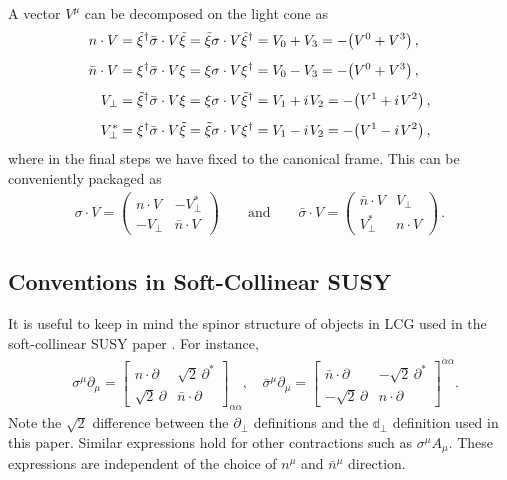 \documentclass[12pt,document,nofootinbib,superscriptaddress,onecolumn,preprintnumbers,balancelastpage]{article}
\newcommand{\s}{\hspace{0.8pt}}
\newcommand{\PP}{\mathbb{d}}
\newcommand{\nbp}{\bar{n}\cdot \partial}
\newcommand{\np}{n\cdot \partial}
\begin{document}
A vector $V^\mu$ can be decomposed on the light cone as
%
\begin{align}
n\cdot V &= \tilde{\xi}^\dag \bar{\sigma}\cdot V \tilde{\xi} = \tilde{\xi} \sigma\cdot V \tilde{\xi}^\dag= V_0 + V_3 = -\big(V^0 + V^3\big)\,, \notag \\[5pt]
\bar{n} \cdot V &= \xi^\dag \bar{\sigma}\cdot V \xi = \xi \sigma\cdot V \xi^\dag= V_0 - V_3 = -\big(V^0 + V^3\big)\,,\notag\\[5pt]
V_\perp &= \tilde{\xi}^\dag \bar{\sigma}\cdot V \xi = \xi \sigma\cdot V \tilde{\xi}^\dag =V_1 + i\s V_2 = -\big(V^1 + i\s V^2\big)\,, \notag\\[5pt] 
V_\perp^{*} &= \xi^\dag \bar{\sigma}\cdot V \tilde{\xi} = \tilde{\xi} \sigma\cdot V \xi^\dag =V_1 - i\s V_2 = -\big(V^1 - i\s V^2\big)\,, 
\end{align}
where in the final steps we have fixed to the canonical frame.
%
This can be conveniently packaged as
\begin{align}
\sigma \cdot V = 
\left(\begin{matrix}
n\cdot V & -V_\perp^* \\
-V_\perp & \bar{n}\cdot V
\end{matrix}\right)
\qquad\text{and} \qquad
\bar{\sigma} \cdot V = 
\left(\begin{matrix}
\bar{n}\cdot V & V_\perp \\
V_\perp^* & n\cdot V
\end{matrix}\right)\,.
\end{align}




\subsection{Conventions in Soft-Collinear SUSY}

It is useful to keep in mind the spinor structure of objects in LCG used in the soft-collinear SUSY paper \cite{Cohen:2016dcl}.
%
For instance,
\begin{align}
& \sigma^\mu \partial_\mu = 
\left[ \begin{array}{cc}
\np & \sqrt{2}\,\partial^*  \\
\sqrt{2}\, \partial & \nbp  \end{array} \right]_{\alpha \dot{\alpha}},  \,
& \bar{\sigma}^\mu \partial_\mu = 
\left[ \begin{array}{cc}
\nbp & -\sqrt{2}\,\partial^*  \\
-\sqrt{2}\, \partial & \np  \end{array} \right]^{\dot{\alpha} \alpha}.
\end{align}
%
Note the $\sqrt{2}$ difference between the $\partial_\perp$ definitions and the $\PP_\perp$ definition used in this paper.
%
Similar expressions hold for other contractions such as $\sigma^\mu A_\mu$.
%
These expressions are independent of the choice of $n^\mu$ and $\bar{n}^\mu$ direction. 
\end{document}
